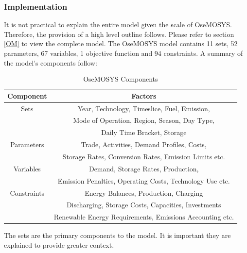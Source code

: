 \documentclass[12pt]{article}
\begin{document}
\subsubsection{Implementation}\label{OIMPLEM}
It is not practical to explain the entire model given the scale of OseMOSYS. 
Therefore, the provision of a high level outline follows. Please refer to section \ref{OM} to view the complete model.
The OseMOSYS model contains 11 sets, 52 parameters, 67 variables, 1 objective function and 94 constraints. 
A summary of the model's components follow:
\begin{table}[H]
	\centering
	\begin{tabular}{||c | c||} 
	 \hline
	 Component & Factors \\ [0.5ex] 
	 \hline\hline
	 Sets & Year, Technology, Timeslice, Fuel, Emission,\\ 
	 & Mode of Operation, Region, Season, Day Type, \\
	 & Daily Time Bracket, Storage \\
	 \hline  
	 Parameters & Trade, Activities, Demand Profiles, Costs, \\
	 & Storage Rates, Conversion Rates, Emission Limits etc. \\
	 \hline
	 Variables & Demand, Storage Rates, Production, \\
	 & Emission Penalties, Operating Costs, Technology Use etc.\\
	 \hline
	 Constraints &  Energy Balances, Production, Charging\\
	 & Discharging, Storage Costs, Capacities, Investments\\ 
	 & Renewable Energy Requirements, Emissions Accounting etc. \\[1ex] 
	 \hline
	\end{tabular}
	\caption{OseMOSYS Components}
	\label{table:1}
	\end{table}
The sets are the primary components to the model. 
It is important they are explained to provide greater context.
\end{document}
